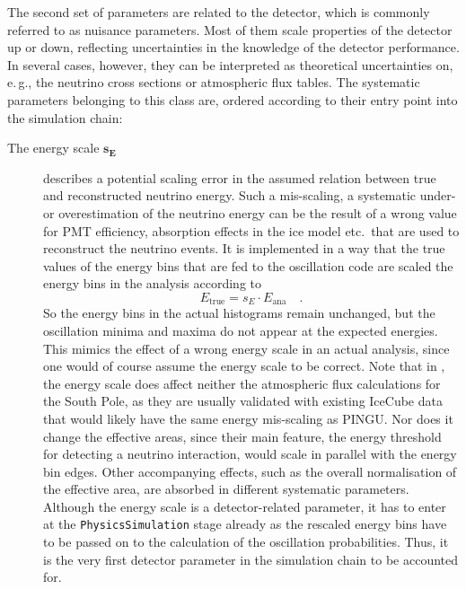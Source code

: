 The second set of parameters are related to the detector, which is commonly 
referred to as 
nuisance parameters. Most of them scale properties of the detector up or down, 
reflecting uncertainties in the knowledge of the detector performance. In 
several cases, however, they can be interpreted as theoretical uncertainties 
on, e.\,g., the neutrino cross sections or atmospheric flux tables. The
systematic parameters belonging to this class are, ordered according to their
entry point into the simulation chain:

\begin{description}
 \item[The energy scale $\mathbf{s_E}$] describes a potential scaling error
  in the assumed relation 
  between true and reconstructed neutrino energy. Such a mis-scaling, \ie
  a systematic under- or overestimation of the neutrino energy can be the 
  result of a wrong value for \eg PMT efficiency, absorption effects in the 
  ice model etc.\ that are used to reconstruct the neutrino events.
  It is implemented in a way that the true values of the energy bins that are 
  fed to the oscillation code are scaled \wrt the energy bins in the analysis 
  according to
  \begin{equation}
   E_\mathrm{true} = s_E\cdot E_\mathrm{ana}\quad.
  \end{equation}
  So the energy bins in the actual histograms remain unchanged, but the 
  oscillation minima and maxima do not appear at the expected energies. This 
  mimics the effect of a wrong energy scale in an actual analysis, since
  one would of course assume the energy scale to be correct. Note that in 
  \papa, the energy scale does affect neither the atmospheric flux calculations
  for the South Pole, as they are usually validated with existing IceCube
  data that would likely have the same energy mis-scaling as PINGU. Nor does it 
  change the
  effective areas, since their main feature, the energy threshold for 
  detecting a neutrino interaction, would scale in parallel with the energy bin 
  edges. Other accompanying effects, such as the overall normalisation of the 
  effective area, are absorbed in different systematic parameters. \\
  Although the energy scale is a detector-related parameter, it has to enter at 
  the \texttt{PhysicsSim\-ul\-ation} stage already as the rescaled energy bins 
  have to be passed on to the calculation of the oscillation probabilities. 
  Thus, it is the very first detector parameter in the simulation chain to be 
  accounted for.

\end{description}
